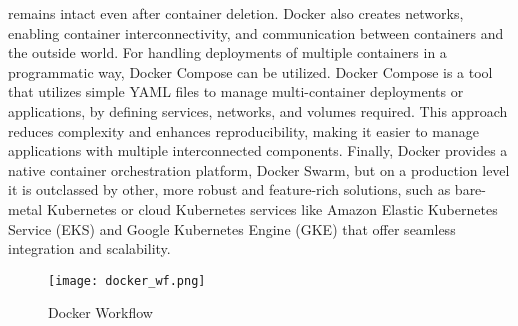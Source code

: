 remains intact even after container deletion. Docker also creates networks, enabling container interconnectivity, and  communication between containers and the outside world. For handling deployments of multiple containers in a programmatic way, Docker Compose can be utilized. Docker Compose is a tool that utilizes simple YAML files to manage multi-container deployments or applications, by defining services, networks, and volumes required. This approach reduces complexity and enhances reproducibility, making it easier to manage applications with multiple interconnected components. Finally, Docker provides a native container orchestration platform, Docker Swarm, but on a production level it is outclassed by other, more robust and feature-rich solutions, such as bare-metal Kubernetes or cloud Kubernetes services like Amazon Elastic Kubernetes Service (EKS) and Google Kubernetes Engine (GKE) that offer seamless integration and scalability.\cite{containers_docker}


\begin{figure}[!h]
    \graphicspath{ {./diagrams/} }
    \texttt{[image: docker\_wf.png]}
    \centering
    \caption{Docker Workflow}
    \label{fig:docker_wf}
\end{figure}

